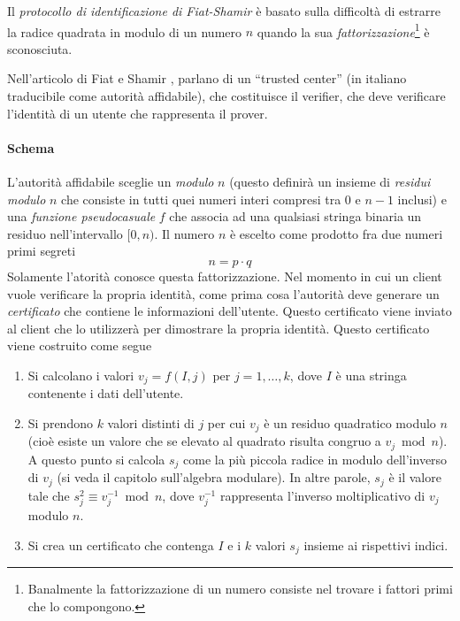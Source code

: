 \documentclass{article}
\theoremstyle{definition}
\begin{document}
Il \emph{protocollo di identificazione di Fiat-Shamir} è basato sulla difficoltà di estrarre la radice quadrata in modulo di un numero $n$ quando la sua \emph{fattorizzazione}\footnote{Banalmente la fattorizzazione di un numero consiste nel trovare i fattori primi che lo compongono.} è sconosciuta.

Nell'articolo di Fiat e Shamir \cite{identification}, parlano di un ``trusted center'' (in italiano traducibile come autorità affidabile), che costituisce il verifier, che deve verificare l'identità di un utente che rappresenta il prover.

\paragraph{Schema}
L'autorità affidabile sceglie un \emph{modulo} $n$ (questo definirà un insieme di \emph{residui modulo} $n$ che consiste in tutti quei numeri interi compresi tra 0 e $n-1$ inclusi) e una \emph{funzione pseudocasuale} $f$ che associa ad una qualsiasi stringa binaria un residuo nell'intervallo $[0, n)$. Il numero $n$ è escelto come prodotto fra due numeri primi segreti
\begin{equation*}
    n = p \cdot q
\end{equation*}
Solamente l'atorità conosce questa fattorizzazione.
Nel momento in cui un client vuole verificare la propria identità, come prima cosa l'autorità deve generare un \emph{certificato} che contiene le informazioni dell'utente. Questo certificato viene inviato al client che lo utilizzerà per dimostrare la propria identità. Questo certificato viene costruito come segue
\begin{enumerate}
    \item Si calcolano i valori $v_j = f(I, j)$ per $j = 1, \dots, k$, dove $I$ è una stringa contenente i dati dell'utente.
    \item Si prendono $k$ valori distinti di $j$ per cui $v_j$ è un residuo quadratico modulo $n$ (cioè esiste un valore che se elevato al quadrato risulta congruo a $v_j \bmod n$). A questo punto si calcola $s_j$ come la più piccola radice in modulo dell'inverso di $v_j$ (si veda il capitolo sull'algebra modulare). In altre parole, $s_j$ è il valore tale che $s_j^2 \equiv v_j^{-1} \bmod n$, dove $v_j^{-1}$ rappresenta l'inverso moltiplicativo di $v_j$ modulo $n$.
    \item Si crea un certificato che contenga $I$ e i $k$ valori $s_j$ insieme ai rispettivi indici.
\end{enumerate}
\end{document}
